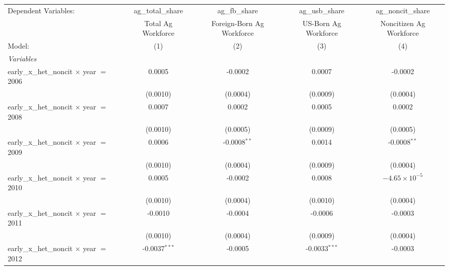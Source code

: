 
\begingroup
\centering
\begin{tabular}{lcccc}
   \tabularnewline \midrule \midrule
   Dependent Variables:                             & ag\_total\_share   & ag\_fb\_share             & ag\_usb\_share       & ag\_noncit\_share\\    
                                                    & Total Ag Workforce & Foreign-Born Ag Workforce & US-Born Ag Workforce & Noncitizen Ag Workforce \\   
   Model:                                           & (1)                & (2)                       & (3)                  & (4)\\  
   \midrule
   \emph{Variables}\\
   early\_x\_het\_noncit $\times$ year $=$ 2006     & 0.0005             & -0.0002                   & 0.0007               & -0.0002\\   
                                                    & (0.0010)           & (0.0004)                  & (0.0009)             & (0.0004)\\   
   early\_x\_het\_noncit $\times$ year $=$ 2008     & 0.0007             & 0.0002                    & 0.0005               & 0.0002\\   
                                                    & (0.0010)           & (0.0005)                  & (0.0009)             & (0.0005)\\   
   early\_x\_het\_noncit $\times$ year $=$ 2009     & 0.0006             & -0.0008$^{**}$            & 0.0014               & -0.0008$^{**}$\\   
                                                    & (0.0010)           & (0.0004)                  & (0.0009)             & (0.0004)\\   
   early\_x\_het\_noncit $\times$ year $=$ 2010     & 0.0005             & -0.0002                   & 0.0008               & $-4.65\times 10^{-5}$\\    
                                                    & (0.0010)           & (0.0004)                  & (0.0010)             & (0.0004)\\   
   early\_x\_het\_noncit $\times$ year $=$ 2011     & -0.0010            & -0.0004                   & -0.0006              & -0.0003\\   
                                                    & (0.0010)           & (0.0004)                  & (0.0009)             & (0.0004)\\   
   early\_x\_het\_noncit $\times$ year $=$ 2012     & -0.0037$^{***}$    & -0.0005                   & -0.0033$^{***}$      & -0.0003\\   

\end{tabular}
